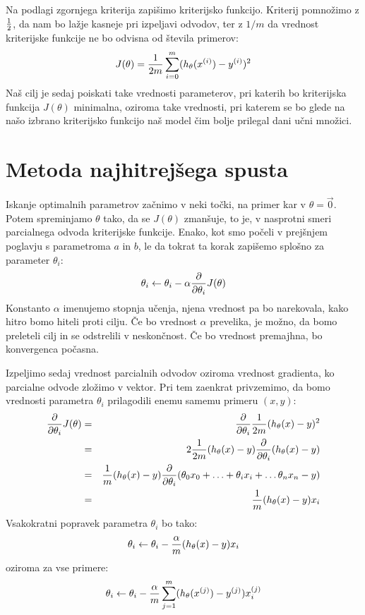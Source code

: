 Na podlagi zgornjega kriterija zapišimo kriterijsko funkcijo. Kriterij
pomnožimo z $1\over 2$, da nam bo lažje kasneje pri izpeljavi odvodov, ter z $1/m$ da vrednost kriterijske funkcije ne bo odvisna od števila primerov:
%
\begin{equation}
J(\theta)={1\over 2m}\sum_{i=0}^m(h_\theta(x^{(i)})-y^{(i)})^2
\end{equation}
%
Naš cilj je sedaj poiskati take vrednosti parameterov, pri katerih bo
kriterijska funkcija $J(\theta)$ minimalna, oziroma take vrednosti,
pri katerem se bo glede na našo izbrano kriterijsko funkcijo naš
model čim bolje prilegal dani učni množici. 

\section{Metoda najhitrejšega spusta}

Iskanje optimalnih parametrov začnimo v neki točki, na primer kar v
$\theta=\vec{0}$. Potem spreminjamo $\theta$ tako, da se $J(\theta)$
zmanšuje, to je, v nasprotni smeri parcialnega odvoda kriterijske
funkcije. Enako, kot smo počeli v prejšnjem poglavju s parametroma $a$
in $b$, le da tokrat ta korak zapišemo splošno za parameter $\theta_i$:
\begin{equation}
  \theta_i\leftarrow\theta_i-\alpha{\partial\over\partial\theta_i}J(\theta)
\end{equation}
%
Konstanto $\alpha$ imenujemo stopnja učenja, njena vrednost pa bo
narekovala, kako hitro bomo hiteli proti cilju. Če bo vrednost
$\alpha$ prevelika, je možno, da bomo preleteli cilj in se odstrelili v
neskončnost. Če bo vrednost premajhna, bo konvergenca počasna.

Izpeljimo sedaj vrednost parcialnih odvodov oziroma vrednost
gradienta, ko parcialne odvode zložimo v vektor. Pri tem zaenkrat privzemimo, da bomo vrednosti parametra $\theta_i$ prilagodili enemu samemu primeru $(x,y)$:
%
\begin{eqnarray}
{\partial\over\partial\theta_i} J(\theta) & = & {\partial\over\partial\theta_i} {1\over 2m}(h_\theta(x)-y)^2 \\
& = & 2{1\over 2m}(h_\theta(x)-y){\partial\over\partial\theta_i}(h_\theta(x)-y) \\
& = & {1\over m}(h_\theta(x)-y){\partial\over\partial\theta_i}(\theta_0 x_0 + \ldots + \theta_i x_i + \ldots \theta_n x_n - y) \\
& = & {1\over m}(h_\theta(x)-y)x_i
\end{eqnarray}
%
Vsakokratni popravek parametra $\theta_i$ bo tako:
\begin{equation}
  \theta_i\leftarrow\theta_i-{\alpha\over m}(h_\theta(x)-y)x_i
\end{equation}
oziroma za vse primere:
\begin{equation}
  \theta_i\leftarrow\theta_i-{\alpha\over m}\sum_{j=1}^m(h_\theta(x^{(j)})-y^{(j)})x_i^{(j)}
\end{equation}

